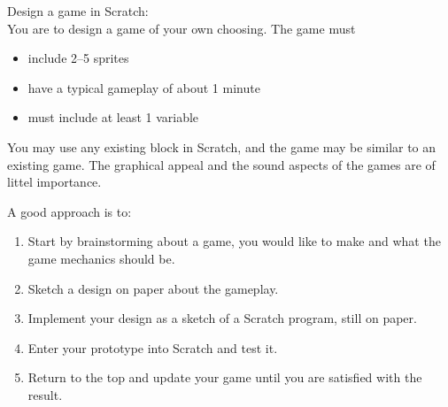 Design a game in Scratch:\\
You are to design a game of your own choosing. The game must
\begin{itemize}
\item include 2--5 sprites 
\item have a typical gameplay of about 1 minute
\item must include at least 1 variable
\end{itemize}
You may use any existing block in Scratch, and the game may be similar
to an existing game. The graphical appeal and the sound aspects of the
games are of littel importance.

A good approach is to:
\begin{enumerate}
\item Start by brainstorming about a game, you would like to make
  and what the game mechanics should be.
\item Sketch a design on paper about the gameplay.
\item Implement your design as a sketch of a Scratch program, still on paper.
\item Enter your prototype into Scratch and test it.
\item Return to the top and update your game until you are satisfied with the result.
\end{enumerate}